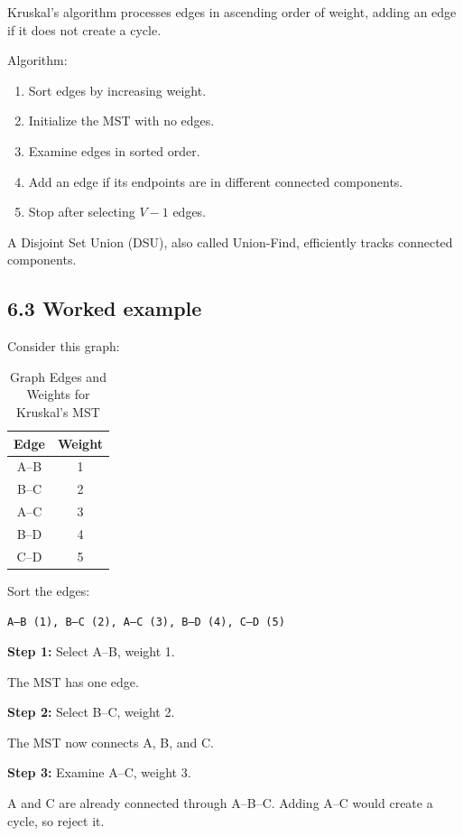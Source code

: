 Kruskal's algorithm processes edges in ascending order of weight, adding an edge if it does not create a cycle.

Algorithm:

\begin{enumerate}
    \item Sort edges by increasing weight.
    \item Initialize the MST with no edges.
    \item Examine edges in sorted order.
    \item Add an edge if its endpoints are in different connected components.
    \item Stop after selecting $V-1$ edges.
\end{enumerate}

A Disjoint Set Union (DSU), also called Union-Find, efficiently tracks connected components.

\subsection{6.3 Worked example}

Consider this graph:

\begin{table}[htbp]
\centering
\caption{Graph Edges and Weights for Kruskal's MST}
\label{tab:kruskal_edges}
\begin{tabular}{cc}
\toprule
\textbf{Edge} & \textbf{Weight} \\
\midrule
A--B & 1 \\
B--C & 2 \\
A--C & 3 \\
B--D & 4 \\
C--D & 5 \\
\bottomrule
\end{tabular}
\end{table}

Sort the edges:

\texttt{A--B (1), B--C (2), A--C (3), B--D (4), C--D (5)}

\textbf{Step 1:} Select A--B, weight 1.

The MST has one edge.

\textbf{Step 2:} Select B--C, weight 2.

The MST now connects A, B, and C.

\textbf{Step 3:} Examine A--C, weight 3.

A and C are already connected through A--B--C. Adding A--C would create a cycle, so reject it.

